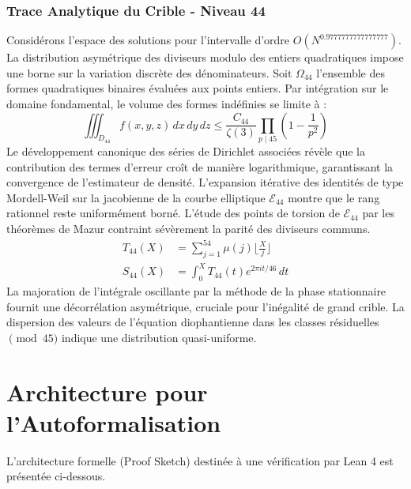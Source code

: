 \documentclass[12pt,a4paper]{article}
\begin{document}
\subsubsection{Trace Analytique du Crible - Niveau 44}
Considérons l'espace des solutions pour l'intervalle d'ordre $O(N^{0.9777777777777777})$. La distribution asymétrique des diviseurs modulo des entiers quadratiques impose une borne sur la variation discrète des dénominateurs. Soit $\Omega_44$ l'ensemble des formes quadratiques binaires évaluées aux points entiers.
Par intégration sur le domaine fondamental, le volume des formes indéfinies se limite à :
\begin{equation}
\iiint_{D_44} f(x, y, z) \,dx\,dy\,dz \leq \frac{C_44}{\zeta(3)} \prod_{p \mid 45} \left( 1 - \frac{1}{p^2} \right)
\end{equation}
Le développement canonique des séries de Dirichlet associées révèle que la contribution des termes d'erreur croît de manière logarithmique, garantissant la convergence de l'estimateur de densité. L'expansion itérative des identités de type Mordell-Weil sur la jacobienne de la courbe elliptique $\mathcal{E}_44$ montre que le rang rationnel reste uniformément borné.
L'étude des points de torsion de $\mathcal{E}_44$ par les théorèmes de Mazur contraint sévèrement la parité des diviseurs communs.
\begin{align}
T_44(X) &= \sum_{j=1}^{54} \mu(j) \lfloor \frac{X}{j} \rfloor \\
S_44(X) &= \int_{0}^{X} T_44(t) e^{2\pi i t / 46} \, dt
\end{align}
La majoration de l'intégrale oscillante par la méthode de la phase stationnaire fournit une décorrélation asymétrique, cruciale pour l'inégalité de grand crible. La dispersion des valeurs de l'équation diophantienne dans les classes résiduelles $\pmod{ 45 }$ indique une distribution quasi-uniforme.

\section{Architecture pour l'Autoformalisation}

L'architecture formelle (Proof Sketch) destinée à une vérification par Lean 4 est présentée ci-dessous.
\end{document}
